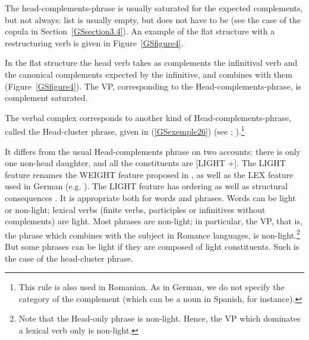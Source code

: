 \documentclass[output=paper
	        ,collection
	        ,collectionchapter
 	        ,biblatex
                ,babelshorthands
                ,newtxmath
                ,draftmode
                ,colorlinks, citecolor=brown
]{langscibook}
\begin{document}
{%



The head-complements-phrase is usually saturated for the expected complements, but not always: list  is usually empty, but does not have to be (see the case of the copula in Section~\ref{GSsection3.4}). An example of the flat structure with a restructuring verb is given in Figure~\ref{GSfigure4}.


In the flat structure the head verb takes as complements the infinitival verb and the canonical complements expected by the infinitive, and combines with them (Figure~\ref{GSfigure4}). The VP, corresponding to the Head-complements-phrase, is complement saturated.

The verbal complex corresponds to another kind of Head-complements-phrase, called the Head-cluster phrase, given in (\ref{GSexemple26}) (see \citealt[6]{Mueller2002b}; \citealt[39]{muller2018clause}).\footnote{This rule is also used in Romanian. As in German, we do not specify the category of the complement (which can be a noun in Spanish, for instance).} 

\newpage
\begin{exe}
\end{exe}

It differs from the usual Head-complements phrase on two accounts: there is only one non-head daughter, and all the constituents are [LIGHT +]. The LIGHT feature \citep{bonami2012phrase} renames the WEIGHT feature proposed in \cite{abeille2000french}, as well as the LEX feature used in German (e.g. \citealt{HN89b, HN94a, Kiss95a, Meurers2000b-Short, Mueller2002b, hohle2018spuren}). The LIGHT feature has ordering as well as structural consequences \citep{abeille2000french, AG2010}. It is appropriate both for words and phrases. Words can be light or non-light; lexical verbs (finite verbs, participles or infinitives without complements) are light. Most phrases are non-light; in particular, the VP, that is, the phrase which combines with the subject in Romance languages, is non-light.\footnote{Note that the Head-only phrase is non-light. Hence, the VP which dominates a lexical verb only is non-light.} But some phrases can be light if they are composed of light constituents. Such is the case of the head-cluster phrase. 

}
\end{document}
